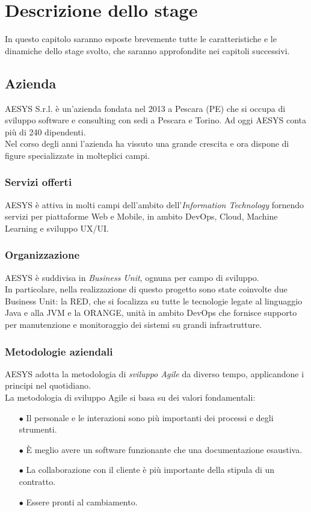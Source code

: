 \chapter{Descrizione dello stage}\label{chapter:descrizione}
In questo capitolo saranno esposte brevemente tutte le caratteristiche e le dinamiche dello stage svolto, che saranno approfondite nei capitoli successivi.

\section{Azienda}\label{sec:azienda}
AESYS S.r.l. è un’azienda fondata nel 2013 a Pescara (PE) che si occupa di sviluppo software e consulting con sedi a Pescara e Torino. Ad oggi AESYS conta più di 240 dipendenti.\\
Nel corso degli anni l’azienda ha vissuto una grande crescita e ora dispone di figure specializzate in molteplici campi.\\

\subsection{Servizi offerti}
AESYS è attiva in molti campi dell’ambito dell’\emph{Information Technology} fornendo servizi per piattaforme Web e Mobile, in ambito DevOps, Cloud, Machine Learning e sviluppo UX/UI.

\subsection{Organizzazione}
AESYS è suddivisa in \emph{Business Unit}, ognuna per campo di sviluppo.\\
In particolare, nella realizzazione di questo progetto sono state coinvolte due Business Unit: la RED, che si focalizza su tutte le tecnologie legate al linguaggio Java e alla JVM e la ORANGE, unità in ambito DevOps che fornisce supporto per manutenzione e monitoraggio dei sistemi su grandi infrastrutture.

\subsection{Metodologie aziendali}
AESYS adotta la metodologia di \emph{sviluppo Agile} da diverso tempo, applicandone i principi nel quotidiano.\\
La metodologia di sviluppo Agile si basa su dei valori fondamentali:
\begin{itemize}
	\item[$\bullet$]Il personale e le interazioni sono più importanti dei processi e degli strumenti.
	\item[$\bullet$]È meglio avere un software funzionante che una documentazione esaustiva.
	\item[$\bullet$]La collaborazione con il cliente è più importante della stipula di un contratto.
	\item[$\bullet$]Essere pronti al cambiamento.
\end{itemize}

